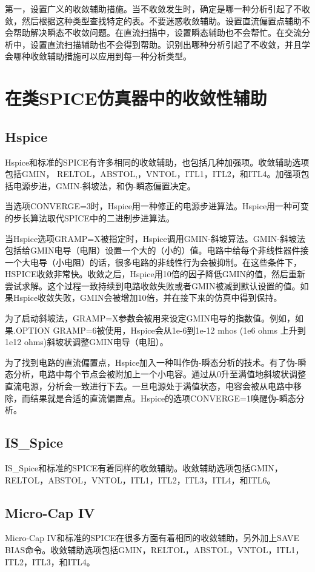 第一，设置广义的收敛辅助措施。当不收敛发生时，确定是哪一种分析引起了不收敛，然后根据这种类型查找特定的表。不要迷惑收敛辅助。设置直流偏置点辅助不会帮助解决瞬态不收敛问题。在直流扫描中，设置瞬态辅助也不会帮忙。在交流分析中，设置直流扫描辅助也不会得到帮助。识别出哪种分析引起了不收敛，并且学会哪种收敛辅助措施可以应用到每一种分析类型。

\section{在类SPICE仿真器中的收敛性辅助}
\subsection{Hspice}
Hspice和标准的SPICE有许多相同的收敛辅助，也包括几种加强项。收敛辅助选项包括GMIN， RELTOL，ABSTOL,，VNTOL，ITL1，ITL2，和ITL4。加强项包括电源步进，GMIN-斜坡法，和伪-瞬态偏置决定。

当选项CONVERGE=3时，Hspice用一种修正的电源步进算法。Hspice用一种可变的步长算法取代SPICE中的二进制步进算法。

当Hspice选项GRAMP=X被指定时，Hspice调用GMIN-斜坡算法。GMIN-斜坡法包括给GMIN电导（电阻）设置一个大的（小的）值。电路中给每个非线性器件接一个大电导（小电阻）的话，很多电路的非线性行为会被抑制。在这些条件下，HSPICE收敛非常快。收敛之后，Hspice用10倍的因子降低GMIN的值，然后重新尝试求解。这个过程一致持续到电路收敛失败或者GMIN被减到默认设置的值。如果Hspice收敛失败，GMIN会被增加10倍，并在接下来的仿真中得到保持。

为了启动斜坡法，GRAMP=X参数会被用来设定GMIN电导的指数值。例如，如果.OPTION GRAMP=6被使用，Hspice会从1e-6到1e-12 mhos (1e6 ohms 上升到1e12 ohms)斜坡状调整GMIN电导（电阻）。

为了找到电路的直流偏置点，Hspice加入一种叫作伪-瞬态分析的技术。有了伪-瞬态分析，电路中每个节点会被附加上一个小电容。通过从0升至满值地斜坡状调整直流电源，分析会一致进行下去。一旦电源处于满值状态，电容会被从电路中移除，而结果就是合适的直流偏置点。Hspice的选项CONVERGE=1唤醒伪-瞬态分析。

\subsection{IS\_{Spice}}
IS\_{Spice}和标准的SPICE有着同样的收敛辅助。收敛辅助选项包括GMIN，RELTOL，ABSTOL，VNTOL，ITL1，ITL2，ITL3，ITL4，和ITL6。

\subsection{Micro-Cap IV}
Micro-Cap IV和标准的SPICE在很多方面有着相同的收敛辅助，另外加上SAVE BIAS命令。收敛辅助选项包括GMIN，RELTOL，ABSTOL，VNTOL，ITL1，ITL2，ITL3，和ITL4。

